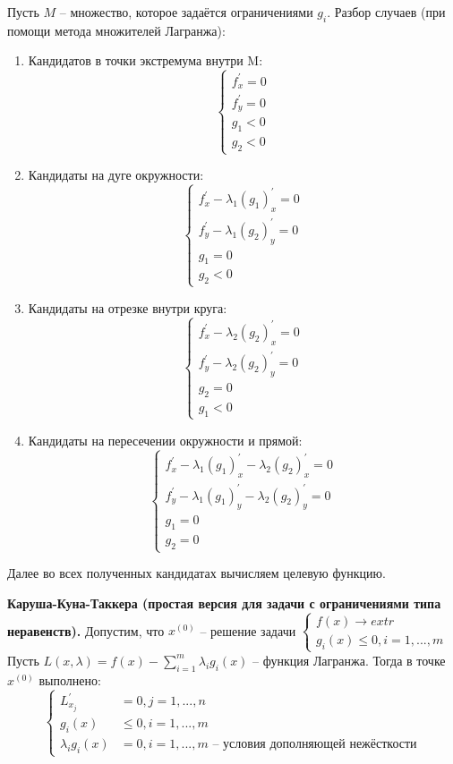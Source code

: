 Пусть $M$ -- множество, которое задаётся ограничениями $g_i$. Разбор случаев (при помощи метода множителей Лагранжа):
\begin{enumerate}
    \item Кандидатов в точки экстремума внутри M:
        \[\left\{\begin{aligned}
            f^{'}_x = 0 \\
            f^{'}_y = 0 \\
            g_1 < 0 \\
            g_2 < 0
        \end{aligned}\right.\]
    \item Кандидаты на дуге окружности:
        \[\left\{\begin{aligned}
            f^{'}_x - \lambda_1 (g_1)^{'}_x = 0 \\
            f^{'}_y - \lambda_1 (g_2)^{'}_y = 0 \\
            g_1 = 0 \\
            g_2 < 0
        \end{aligned}\right.\]
    \item Кандидаты на отрезке внутри круга:
        \[\left\{\begin{aligned}
            f^{'}_x - \lambda_2 (g_2)^{'}_x = 0 \\
            f^{'}_y - \lambda_2 (g_2)^{'}_y = 0 \\
            g_2 = 0 \\
            g_1 < 0
        \end{aligned}\right.\]
    \item Кандидаты на пересечении окружности и прямой:
        \[\left\{\begin{aligned}
            f^{'}_x - \lambda_1 (g_1)^{'}_x - \lambda_2 (g_2)^{'}_x = 0 \\
            f^{'}_y - \lambda_1 (g_1)^{'}_y - \lambda_2 (g_2)^{'}_y = 0 \\
            g_1 = 0 \\
            g_2 = 0
        \end{aligned}\right.\]
\end{enumerate}
Далее во всех полученных кандидатах вычисляем целевую функцию.

\begin{theorem}{\textbf{Каруша-Куна-Таккера (простая версия для задачи с ограничениями типа неравенств).}}
Допустим, что $x^{(0)}$ -- решение задачи
$\begin{cases}
    f(x) \to extr \\
    g_i(x) \leqslant 0, i = 1, ..., m
\end{cases}$\\
Пусть $L(x, \lambda) = f(x) - \sum\limits_{i = 1}^{m} \lambda_i g_i(x)$ -- функция Лагранжа. Тогда в точке $x^{(0)}$ выполнено:
\[\left\{\begin{aligned}
    L^{'}_{x_j} &= 0, j = 1, ..., n\\
    g_i(x) &\leqslant 0, i = 1, ..., m\\
    \lambda_i g_i(x) &= 0, i = 1, ..., m \text{ -- условия дополняющей нежёсткости}
\end{aligned}\right.\]
\end{theorem}

